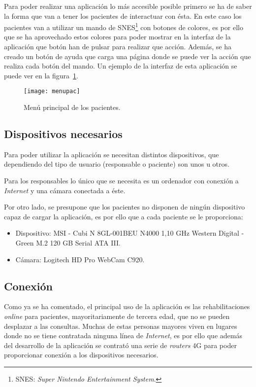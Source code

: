 {Para poder realizar una aplicación lo más accesible posible primero se ha de saber la forma que van a tener los pacientes de interactuar con ésta. En este caso los pacientes van a utilizar un mando de SNES\footnote{SNES: \textit{Super Nintendo Entertainment System}.} con botones de colores, es por ello que se ha aprovechado estos colores para poder mostrar en la interfaz de la aplicación que botón han de pulsar para realizar que acción. Además, se ha creado un botón de ayuda que carga una página donde se puede ver la acción que realiza cada botón del mando. Un ejemplo de la interfaz de esta aplicación se puede ver en la figura~\ref{fig:menupaciente}.

\begin{figure}[h]
	\centering
	\texttt{[image: menupac]}
	\caption{Menú principal de los pacientes.}
	\label{fig:menupaciente}
\end{figure}

\subsection{Dispositivos necesarios}
Para poder utilizar la aplicación se necesitan distintos dispositivos, que dependiendo del tipo de usuario (responsable o paciente) son unos u otros.

Para los responsables lo único que se necesita es un ordenador con conexión a \textit{Internet} y una cámara conectada a éste.

Por otro lado, se presupone que los pacientes no disponen de ningún dispositivo capaz de cargar la aplicación, es por ello que a cada paciente se le proporciona:
\begin{itemize}
	\item Dispositivo: MSI - Cubi N 8GL-001BEU N4000 1,10 GHz Western Digital - Green M.2 120 GB Serial ATA III.
	\item Cámara: Logitech HD Pro WebCam C920.
\end{itemize}

\subsection{Conexión}
Como ya se ha comentado, el principal uso de la aplicación es las rehabilitaciones \textit{online} para pacientes, mayoritariamente de tercera edad, que no se pueden desplazar a las consultas. Muchas de estas personas mayores viven en lugares donde no se tiene contratada ninguna línea de \textit{Internet}, es por ello que además del desarrollo de la aplicación se contrató una serie de \textit{routers} 4G para poder proporcionar conexión a los dispositivos necesarios. 

}
